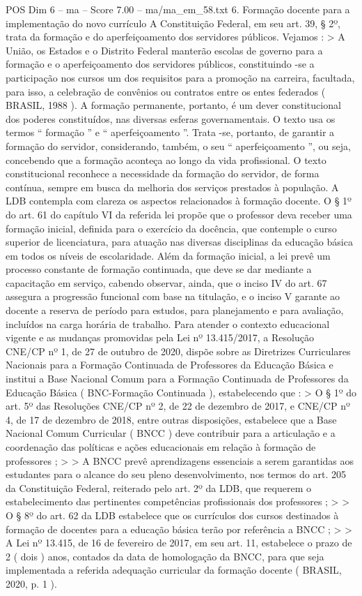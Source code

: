 \begin{textsample}{POS Dim 6 – ma – Score 7.00 – ma/ma\_em\_58.txt}  \label{ex:f6_pos_100}
6.
Formação docente para a implementação do novo currículo A Constituição Federal, em seu art. 39, § 2º, trata da formação e do aperfeiçoamento dos servidores públicos.
Vejamos : > A União, os Estados e o Distrito Federal manterão escolas de governo para a formação e o aperfeiçoamento dos servidores públicos, constituindo -se a participação nos cursos um dos requisitos para a promoção na carreira, facultada, para isso, a celebração de convênios ou contratos entre os entes federados ( BRASIL, 1988 ).
A formação permanente, portanto, é um dever constitucional dos poderes constituídos, nas diversas esferas governamentais.
O texto usa os termos “ formação ” e “ aperfeiçoamento ”.
Trata -se, portanto, de garantir a formação do servidor, considerando, também, o seu “ aperfeiçoamento ”, ou seja, concebendo que a formação aconteça ao longo da vida profissional.
O texto constitucional reconhece a necessidade da formação do servidor, de forma contínua, sempre em busca da melhoria dos serviços prestados à população.
A LDB contempla com clareza os aspectos relacionados à formação docente.
O § 1º do art. 61 do capítulo VI da referida lei propõe que o professor deva receber uma formação inicial, definida para o exercício da docência, que contemple o curso superior de licenciatura, para atuação nas diversas disciplinas da educação básica em todos os níveis de escolaridade.
Além da formação inicial, a lei prevê um processo constante de formação continuada, que deve se dar mediante a capacitação em serviço, cabendo observar, ainda, que o inciso IV do art. 67 assegura a progressão funcional com base na titulação, e o inciso V garante ao docente a reserva de período para estudos, para planejamento e para avaliação, incluídos na carga horária de trabalho.
Para atender o contexto educacional vigente e as mudanças promovidas pela Lei nº 13.415/2017, a Resolução CNE/CP nº 1, de 27 de outubro de 2020, dispõe sobre as Diretrizes Curriculares Nacionais para a Formação Continuada de Professores da Educação Básica e institui a Base Nacional Comum para a Formação Continuada de Professores da Educação Básica ( BNC-Formação Continuada ), estabelecendo que : > O § 1º do art. 5º das Resoluções CNE/CP nº 2, de 22 de dezembro de 2017, e CNE/CP nº 4, de 17 de dezembro de 2018, entre outras disposições, estabelece que a Base Nacional Comum Curricular ( BNCC ) deve contribuir para a articulação e a coordenação das políticas e ações educacionais em relação à formação de professores ; > > A BNCC prevê aprendizagens essenciais a serem garantidas aos estudantes para o alcance do seu pleno desenvolvimento, nos termos do art. 205 da Constituição Federal, reiterado pelo art. 2º da LDB, que requerem o estabelecimento das pertinentes competências profissionais dos professores ; > > O § 8º do art. 62 da LDB estabelece que os currículos dos cursos destinados à formação de docentes para a educação básica terão por referência a BNCC ; > > A Lei nº 13.415, de 16 de fevereiro de 2017, em seu art. 11, estabelece o prazo de 2 ( dois ) anos, contados da data de homologação da BNCC, para que seja implementada a referida adequação curricular da formação docente ( BRASIL, 2020, p. 1 ).

\end{textsample}
